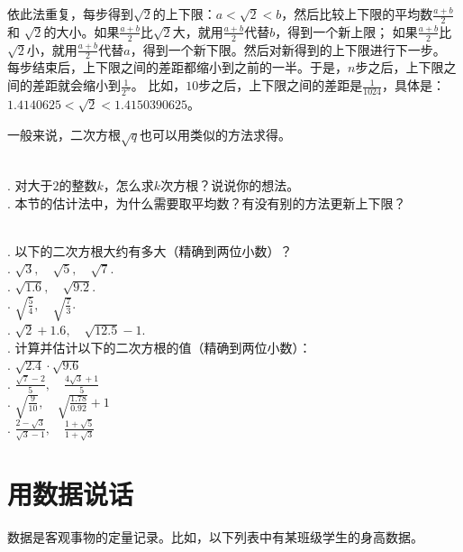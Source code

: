 \documentclass[12pt,UTF8,fontset=none]{ctexbook}
\begin{document}
依此法重复，每步得到$\sqrt{2}$的上下限：$a < \sqrt{2} < b$，然后比较上下限的平均数$\frac{a+b}{2}$和
$\sqrt{2}$的大小。如果$\frac{a+b}{2}$比$\sqrt{2}$大，就用$\frac{a+b}{2}$代替$b$，得到一个新上限；
如果$\frac{a+b}{2}$比$\sqrt{2}$小，就用$\frac{a+b}{2}$代替$a$，得到一个新下限。然后对新得到的上下限进行下一步。
每步结束后，上下限之间的差距都缩小到之前的一半。于是，$n$步之后，上下限之间的差距就会缩小到$\frac{1}{2^n}$。
比如，$10$步之后，上下限之间的差距是$\frac{1}{1024}$，具体是：$1.4140625 < \sqrt{2} < 1.4150390625$。

一般来说，二次方根$\sqrt{q}$也可以用类似的方法求得。
\begin{sk}\label{sk:3-2-0}
    \mbox{}\\
    . 对大于$2$的整数$k$，怎么求$k$次方根？说说你的想法。\\
    . 本节的估计法中，为什么需要取平均数？有没有别的方法更新上下限？
\end{sk}

\begin{xt}\label{xt:3-2-0}
    \mbox{}\\
    . 以下的二次方根大约有多大（精确到两位小数）？\\
    . $\sqrt{3},\quad \sqrt{5},\quad \sqrt{7}$.\\
    . $\sqrt{1.6},\quad \sqrt{9.2}$.\\
    . $\displaystyle\sqrt{\frac{5}{4}}, \quad \sqrt{\frac{7}{3}}$.\\
    . $\sqrt{2} + 1.6,\quad \sqrt{12.5} - 1$.\\
    . 计算并估计以下的二次方根的值（精确到两位小数）：\\
    . $\sqrt{2.4} \cdot \sqrt{9.6}$\\
    . $\displaystyle\frac{\sqrt{7} - 2}{5}, \quad \frac{4\sqrt{3} + 1}{5}$\\
    . $\displaystyle\sqrt{\frac{9}{10}}, \quad\sqrt{\frac{1.78}{0.92}} + 1  $\\
    . $\displaystyle\frac{2 - \sqrt{3}}{\sqrt{3} - 1}, \quad \frac{1 + \sqrt{5}}{1 + \sqrt{3}}$
\end{xt}

\chapter{用数据说话}
数据是客观事物的定量记录。比如，以下列表中有某班级学生的身高数据。
\end{document}
